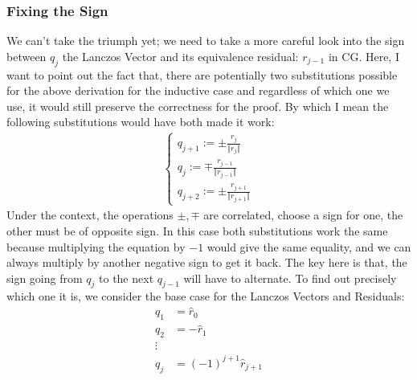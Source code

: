 \documentclass[]{article}
\theoremstyle{definition}
\begin{document}
\begin{appendices}
            \subsubsection{Fixing the Sign}
                We can't take the triumph yet; we need to take a more careful look into the sign between $q_j$ the Lanczos Vector and its equivalence residual: $r_{j - 1}$ in CG. Here, I want to point out the fact that, there are potentially two substitutions possible for the above derivation for the inductive case and regardless of which one we use, it would still preserve the correctness for the proof. By which I mean the following substitutions would have both made it work: 
                \begin{align}
                    \begin{cases}
                        q_{j + 1} := \pm \frac{r_j}{\Vert r_j\Vert}
                        \\
                        q_{j} := \mp \frac{r_{j - 1}}{\Vert r_{j - 1}\Vert}
                        \\
                        q_{j + 2} := \pm \frac{r_{j + 1}}{\Vert r_{j + 1}\Vert}
                    \end{cases}
                \end{align}
                Under the context, the operations $\pm, \mp$ are correlated, choose a sign for one, the other must be of opposite sign. In this case both substitutions work the same because multiplying the equation by $-1$ would give the same equality, and we can always multiply by another negative sign to get it back. The key here is that, the sign going from $q_{j}$ to the next $q_{j - 1}$ will have to alternate. To find out precisely which one it is, we consider the base case for the Lanczos Vectors and Residuals: 
                \begin{align}
                    q_1 &= \hat r_0\\
                    q_2 &= -\hat r_1
                    \\
                    \vdots
                    \\
                    q_j &= (-1)^{j + 1}\hat r_{j + 1}
                \end{align}

\end{appendices}
\end{document}
